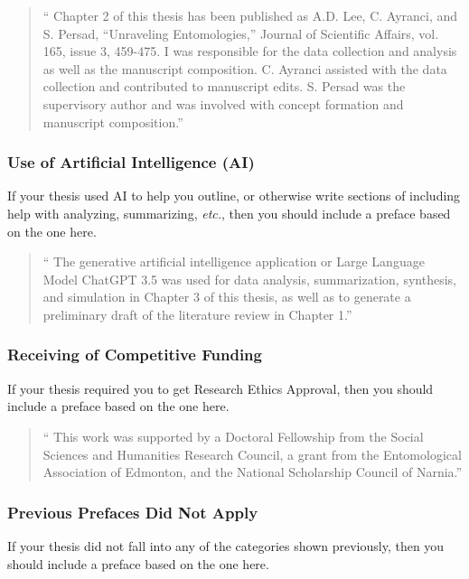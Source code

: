 				\begin{quote}
					\enquote{
						Chapter 2 of this thesis has been published as A.D. Lee, C. Ayranci, and S. Persad,  “Unraveling Entomologies,” Journal of Scientific Affairs, vol. 165, issue 3, 459-475. 
						I was responsible for the data collection and analysis as well as the manuscript composition. C. Ayranci assisted with the data collection and contributed to manuscript edits. S. Persad was the supervisory author and was involved with concept formation and manuscript composition.}
				\end{quote}

			\subsubsection{Use of Artificial Intelligence (AI)}
				If your thesis used AI to help you outline, or otherwise write sections of including help with analyzing, summarizing, \textit{etc.}, then you should include a preface based on the one here.

				\begin{quote}
					\enquote{
						The generative artificial intelligence application or Large Language Model ChatGPT 3.5 was used for data analysis, summarization, synthesis, and simulation in Chapter 3 of this thesis, as well as to generate a preliminary draft of the literature review in Chapter 1.}
				\end{quote}
				
			\subsubsection{Receiving of Competitive Funding}
				If your thesis required you to get Research Ethics Approval, then you should include a preface based on the one here.

				\begin{quote}
					\enquote{
						This work was supported by a Doctoral Fellowship from the Social Sciences and Humanities Research Council, a grant from the Entomological Association of Edmonton, and the National Scholarship Council of Narnia.}
				\end{quote}
				
			\subsubsection{Previous Prefaces Did Not Apply}\label{sssec:preface}
				If your thesis did not fall into any of the categories shown previously, then you should include a preface based on the one here.

